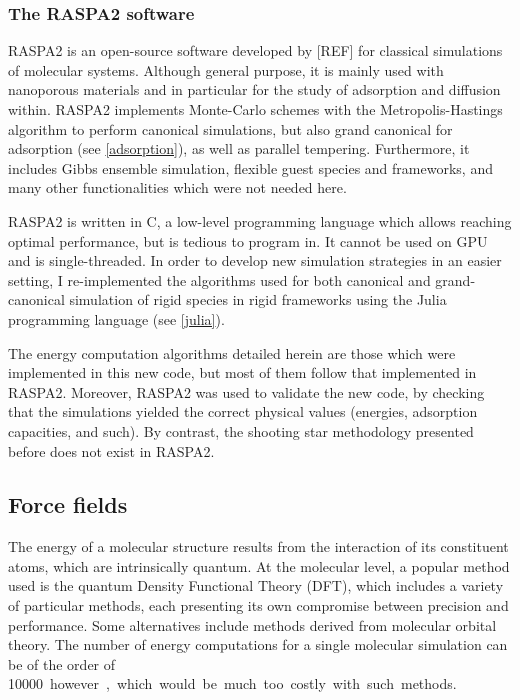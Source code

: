 \documentclass[main.tex]{subfiles}
\begin{document}
\subsubsection{The RASPA2 software}

RASPA2 is an open-source software developed by [REF] for classical simulations of molecular systems. Although general purpose, it is mainly used with nanoporous materials and in particular for the study of adsorption and diffusion within. RASPA2 implements Monte-Carlo schemes with the Metropolis-Hastings algorithm to perform canonical simulations, but also grand canonical for adsorption (see \autoref{adsorption}), as well as parallel tempering. Furthermore, it includes Gibbs ensemble simulation, flexible guest species and frameworks, and many other functionalities which were not needed here.

RASPA2 is written in C, a low-level programming language which allows reaching optimal performance, but is tedious to program in. It cannot be used on GPU and is single-threaded. In order to develop new simulation strategies in an easier setting, I re-implemented the algorithms used for both canonical and grand-canonical simulation of rigid species in rigid frameworks using the Julia programming language (see \autoref{julia}).

The energy computation algorithms detailed herein are those which were implemented in this new code, but most of them follow that implemented in RASPA2. Moreover, RASPA2 was used to validate the new code, by checking that the simulations yielded the correct physical values (energies, adsorption capacities, and such). By contrast, the shooting star methodology presented before does not exist in RASPA2.

\subsection{Force fields}

The energy of a molecular structure results from the interaction of its constituent atoms, which are intrinsically quantum. At the molecular level, a popular method used is the quantum Density Functional Theory (DFT), which includes a variety of particular methods, each presenting its own compromise between precision and performance. Some alternatives include methods derived from molecular orbital theory. The number of energy computations for a single molecular simulation can be of the order of \qty{10000} however, which would be much too costly with such methods.
\end{document}
